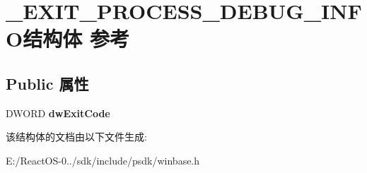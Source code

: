 \hypertarget{struct___e_x_i_t___p_r_o_c_e_s_s___d_e_b_u_g___i_n_f_o}{}\section{\+\_\+\+E\+X\+I\+T\+\_\+\+P\+R\+O\+C\+E\+S\+S\+\_\+\+D\+E\+B\+U\+G\+\_\+\+I\+N\+F\+O结构体 参考}
\label{struct___e_x_i_t___p_r_o_c_e_s_s___d_e_b_u_g___i_n_f_o}
\subsection*{Public 属性}
\begin{DoxyCompactItemize}
\item 
\mbox{\label{struct___e_x_i_t___p_r_o_c_e_s_s___d_e_b_u_g___i_n_f_o_a13c6e53be0365971e9d9bbcf792fd297}} 
D\+W\+O\+RD {\bfseries dw\+Exit\+Code}
\end{DoxyCompactItemize}


该结构体的文档由以下文件生成\+:\begin{DoxyCompactItemize}
\item 
E\+:/\+React\+O\+S-\/0../sdk/include/psdk/winbase.\+h\end{DoxyCompactItemize}
